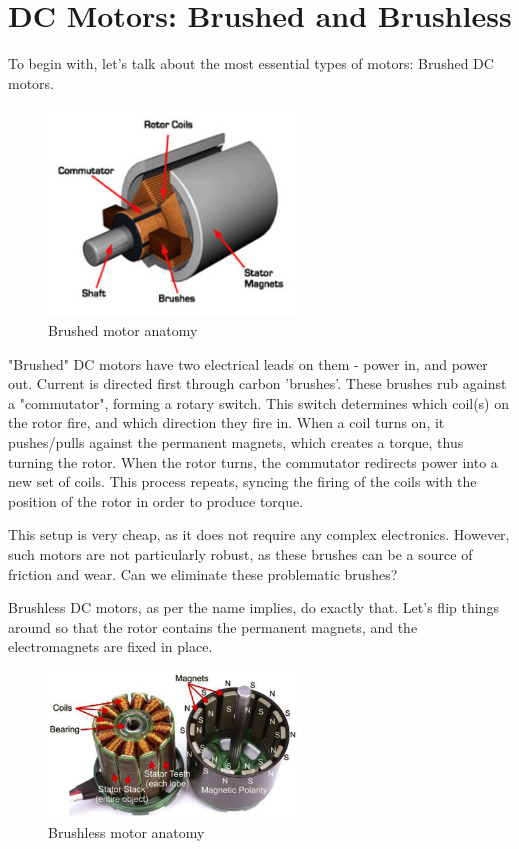 \documentclass[10pt,letterpaper]{book}
\begin{document}
\section{DC Motors: Brushed and Brushless}

To begin with, let's talk about the most essential types of motors: Brushed DC motors.

\begin{figure}[H]\centering
\includegraphics[width=0.6\textwidth]{imgs/img_Mechatronics_Motors_brushed.png}
\caption{Brushed motor anatomy}
\end{figure}

"Brushed" DC motors have two electrical leads on them - power in, and power out. Current is directed first through carbon 'brushes'. These brushes rub against a "commutator", forming a rotary switch. This switch determines which coil(s) on the rotor fire, and which direction they fire in. When a coil turns on, it pushes/pulls against the permanent magnets, which creates a torque, thus turning the rotor. When the rotor turns, the commutator redirects power into a new set of coils. This process repeats, syncing the firing of the coils with the position of the rotor in order to produce torque. 


This setup is very cheap, as it does not require any complex electronics. However, such motors are not particularly robust, as these brushes can be a source of friction and wear. Can we eliminate these problematic brushes?

Brushless DC motors, as per the name implies, do exactly that. Let's flip things around so that the rotor contains the permanent magnets, and the electromagnets are fixed in place.
\begin{figure}[H]\centering
\includegraphics[width=0.6\textwidth]{imgs/img_Mechatronics_Motors_brushless.png}
\caption{Brushless motor anatomy}
\end{figure}
\end{document}
